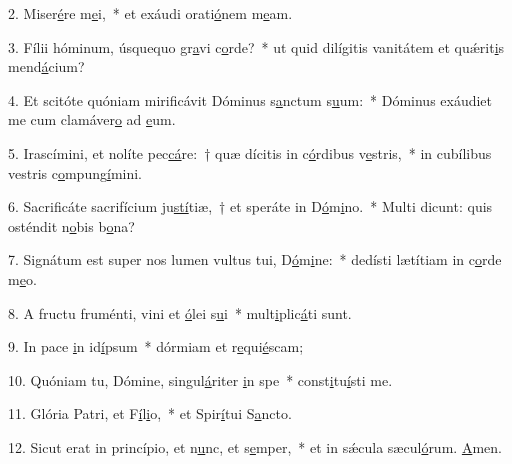 2. Miser\uline{é}re m\uline{e}i,~* et exáudi orati\uline{ó}nem m\uline{e}am.\par 
3. Fílii hóminum, úsquequo gr\uline{a}vi c\uline{o}rde?~* ut quid dilígitis vanitátem et quǽrit\uline{i}s mend\uline{á}cium?\par 
4. Et scitóte quóniam mirificávit Dóminus s\uline{a}nctum s\uline{u}um:~* Dóminus exáudiet me cum clamáver\uline{o} ad \uline{e}um.\par 
5. Irascímini, et nolíte pec\uline{cá}re:~† quæ dícitis in c\uline{ó}rdibus v\uline{e}stris,~* in cubílibus vestris c\uline{o}mpung\uline{í}mini.\par 
6. Sacrificáte sacrifícium ju\uline{stí}tiæ,~† et speráte in D\uline{ó}m\uline{i}no.~* Multi dicunt: quis osténdit n\uline{o}bis b\uline{o}na?\par 
7. Signátum est super nos lumen vultus tui, D\uline{ó}m\uline{i}ne:~* dedísti lætítiam in c\uline{o}rde m\uline{e}o.\par 
8. A fructu fruménti, vini et \uline{ó}lei s\uline{u}i~* mult\uline{i}plic\uline{á}ti sunt.\par 
9. In pace \uline{i}n id\uline{í}psum~* dórmiam et r\uline{e}qui\uline{é}scam;\par 
10. Quóniam tu, Dómine, singul\uline{á}riter \uline{i}n spe~* const\uline{i}tu\uline{í}sti me.\par 
11. Glória Patri, et F\uline{í}l\uline{i}o,~* et Spir\uline{í}tui S\uline{a}ncto.\par 
12. Sicut erat in princípio, et n\uline{u}nc, et s\uline{e}mper,~* et in sǽcula sæcul\uline{ó}rum. \uline{A}men.\par 
